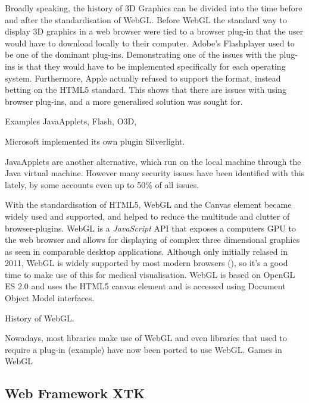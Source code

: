 \documentclass[a4paper,11pt,titlepage]{article}
\begin{document}
Broadly speaking, the history of 3D Graphics can be divided into the time before and after the standardisation of WebGL. Before WebGL the standard way to display 3D graphics in a web browser were tied to a browser plug-in that the user would have to download locally to their computer. Adobe's Flashplayer used to be one of the dominant plug-ins. Demonstrating one of the issues with the plug-ins is that they would have to be implemented specifically for each operating system. Furthermore, Apple actually refused to support the format, instead betting on the HTML5 standard. This shows that there are issues with using browser plug-ins, and a more generalised solution was sought for.

Examples JavaApplets, Flash, O3D, 

Microsoft implemented its own plugin Silverlight.

JavaApplets are another alternative, which run on the local machine through the Java virtual machine. However many security issues have been identified with this lately, by some accounts even up to 50\% of all issues.

With the standardisation of HTML5, WebGL and the Canvas element became widely used and supported, and helped to reduce the multitude and clutter of browser-plugins. WebGL is a \textit{JavaScript} API that exposes a computers GPU to the web browser and allows for displaying of complex three dimensional graphics as seen in comparable desktop applications. Although only initially relased in 2011, WebGL is widely supported by most modern browsers (\cite{webGL}), so it's a good time to make use of this for medical visualisation. WebGL is based on OpenGL ES 2.0 and uses the HTML5 canvas element and is accessed using Document Object Model interfaces.

History of WebGL. 

Nowadays, most libraries make use of WebGL and even libraries that used to require a plug-in (example) have now been ported to use WebGL. 
Games in WebGL



\subsection{Web Framework XTK}
\end{document}
